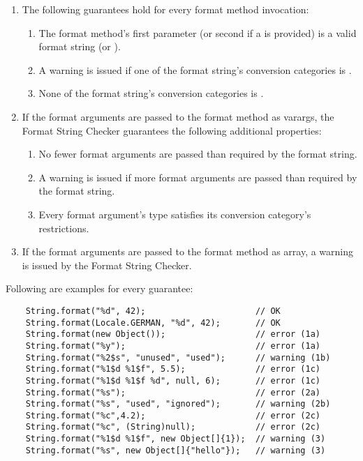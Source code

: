 \begin{enumerate}
\item
The following guarantees hold for every format method invocation:

\begin{enumerate}
    \item The format method's first parameter (or second if a  is provided) is a valid
        format string (or ).

    \item A warning is issued if one of the format string's conversion categories is .
        \label{formatter-unused-category-warning}
    \item None of the format string's conversion categories is .
        \label{formatter-null-category-error}
\end{enumerate}

\item If the format arguments are passed to the format method as varargs, the
Format String Checker guarantees the following additional properties:

\begin{enumerate}
\item No fewer format arguments are passed than required by the format string.
\item A warning is issued if more format arguments are passed than required by the format string.
\item Every format argument's type satisfies its conversion category's restrictions.
\end{enumerate}

\item If the format arguments are passed to the format method as array,
a warning is issued by the Format String Checker.
        \label{formatter-array-warning}
\end{enumerate}


\noindent Following are examples for every guarantee:

\begin{Verbatim}
    String.format("%d", 42);                      // OK
    String.format(Locale.GERMAN, "%d", 42);       // OK
    String.format(new Object());                  // error (1a)
    String.format("%y");                          // error (1a)
    String.format("%2$s", "unused", "used");      // warning (1b)
    String.format("%1$d %1$f", 5.5);              // error (1c)
    String.format("%1$d %1$f %d", null, 6);       // error (1c)
    String.format("%s");                          // error (2a)
    String.format("%s", "used", "ignored");       // warning (2b)
    String.format("%c",4.2);                      // error (2c)
    String.format("%c", (String)null);            // error (2c)
    String.format("%1$d %1$f", new Object[]{1});  // warning (3)
    String.format("%s", new Object[]{"hello"});   // warning (3)
\end{Verbatim}

